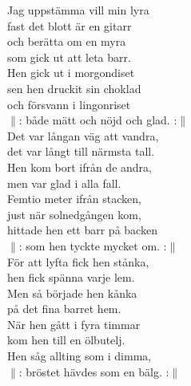 \documentclass[a6paper, 10pt, twoside]{article}
\begin{document}
\begin{center}
\end{center}
\begin{lyrics}
\small Jag uppstämma vill min lyra\\ 
fast det blott är en gitarr\\ 
och berätta om en myra\\ 
som gick ut att leta barr.\\ 
Hen gick ut i morgondiset\\ 
sen hen druckit sin choklad\\ 
och försvann i lingonriset\\ 
$\|$: både mätt och nöjd och glad. :$\|$
\vspace{5pt}\\ 
Det var långan väg att vandra,\\ 
det var långt till närmsta tall.\\ 
Hen kom bort ifrån de andra,\\ 
men var glad i alla fall.\\ 
Femtio meter ifrån stacken,\\ 
just när solnedgången kom,\\ 
hittade hen ett barr på backen\\ 
$\|$: som hen tyckte mycket om. :$\|$
\vspace{5pt}\\  
För att lyfta fick hen stånka,\\ 
hen fick spänna varje lem.\\
Men så började hen kånka\\ 
på det fina barret hem.\\ 
När hen gått i fyra timmar\\ 
kom hen till en ölbutelj.\\ 
Hen såg allting som i dimma,\\ 
$\|$: bröstet hävdes som en bälg. :$\|$
\vspace{5pt}\\  


\end{lyrics}
\end{document}
